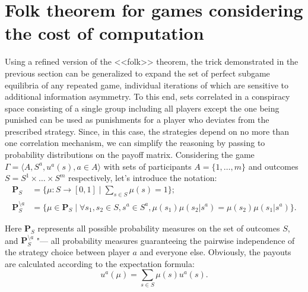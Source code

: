 \section{Folk theorem for games considering the cost of computation}\label{sec:ch3/sect5}

Using a refined version of the <<folk>> theorem, the trick demonstrated in the previous section can be generalized to expand the set of perfect subgame equilibria of any repeated game, individual iterations of which are sensitive to additional information asymmetry. To this end, sets correlated in a conspiracy space consisting of a single group including all players except the one being punished can be used as punishments for a player who deviates from the prescribed strategy. Since, in this case, the strategies depend on no more than one correlation mechanism, we can simplify the reasoning by passing to probability distributions on the payoff matrix. Considering the game $\Gamma = \langle A, S^a, u^a(s), a \in A \rangle$ with sets of participants $A = \{1, \ldots, m\}$ and outcomes $S = S^1 \times \ldots \times S^m$ respectively, let's introduce the notation: %
\begin{align*}
	\mathbf{P}_S &= \{\mu : S \rightarrow [0, 1] \mid \sum_{s \in S} \mu(s) = 1\}; \\
	\mathbf{P}_S^{\setminus a} &= \{\mu \in \mathbf{P}_S \mid \forall s_1, s_2 \in S, s^a \in S^a, \mu(s_1) \mu(s_2 | s^a) = \mu(s_2) \mu(s_1 | s^a)\}.
\end{align*}

Here $\mathbf{P}_S$ represents all possible probability measures on the set of outcomes $S$, and $\mathbf{P}_S^{\setminus a}$ "--- all probability measures guaranteeing the pairwise independence of the strategy choice between player $a$ and everyone else. Obviously, the payouts are calculated according to the expectation formula: %
\begin{equation*}
	u^a(\mu) = \sum_{s \in S} \mu(s) u^a(s).
\end{equation*}

